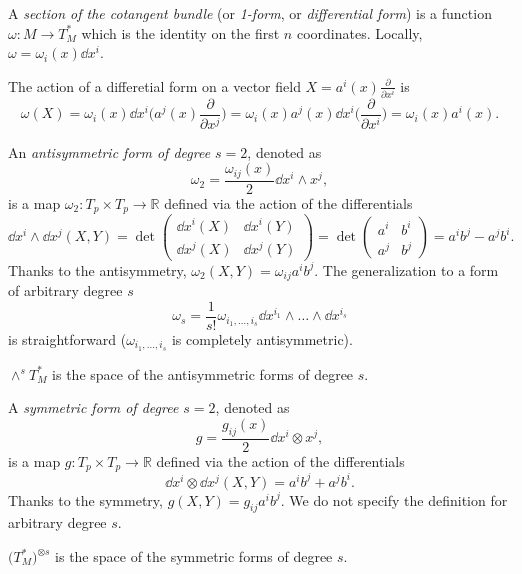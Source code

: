 \documentclass[a4paper,12pt]{book}
\begin{document}
\begin{definition}
A \emph{section of the cotangent bundle} (or \emph{1-form}, or \emph{differential form}) is a function $\omega\colon M\to T_M^*$ which is the identity on the first $n$ coordinates. Locally, $\omega=\omega_i(x)\dd x^i$.
\end{definition}

The action of a differetial form on a vector field $X=a^i(x)\frac{\partial}{\partial x^i}$ is
\[\omega(X)=\omega_i(x)\dd x^i\biggl(a^j(x)\frac{\partial}{\partial x^j}\biggr)=\omega_i(x)a^j(x)\dd x^i\biggl(\frac{\partial}{\partial x^i}\biggr)=\omega_i(x)a^i(x).\]

\begin{definition}
An \emph{antisymmetric form of degree $s=2$}, denoted as
\[\omega_2=\frac{\omega_{ij}(x)}{2}\dd x^i\wedge x^j,\] is a map $\omega_2\colon T_p\times T_p\to\mathbb R$ defined via the action of the differentials
\[\dd x^i\wedge \dd x^j(X,Y)=\det
\begin{pmatrix}
\dd x^i(X)& \dd x^i(Y)\\
\dd x^j(X)& \dd x^j(Y)
\end{pmatrix}=\det
\begin{pmatrix}
a^i& b^i\\
a^j& b^j
\end{pmatrix}=a^ib^j-a^jb^i.\]
Thanks to the antisymmetry, $\omega_2(X,Y)=\omega_{ij}a^ib^j$. The generalization to a form of arbitrary degree $s$
\[\omega_s=\frac{1}{s!}\omega_{i_1,\ldots,i_s}\dd x^{i_1}\wedge\ldots\wedge\dd x^{i_s}\]
is straightforward ($\omega_{i_1,\ldots,i_s}$ is completely antisymmetric).
\end{definition}

\begin{definition}
$\wedge^sT_M^*$ is the space of the antisymmetric forms of degree $s$.
\end{definition}

\begin{definition}
A \emph{symmetric form of degree $s=2$}, denoted as
\[g=\frac{g_{ij}(x)}{2}\dd x^i\otimes x^j,\] is a map $g\colon T_p\times T_p\to\mathbb R$ defined via the action of the differentials
\[\dd x^i\otimes \dd x^j(X,Y)=a^ib^j+a^jb^i.\]
Thanks to the symmetry, $g(X,Y)=g_{ij}a^ib^j$. We do not specify the definition for arbitrary degree $s$.
\end{definition}

\begin{definition}
$\bigl(T_M^*\bigr)^{\otimes s}$ is the space of the symmetric forms of degree $s$.
\end{definition}
\end{document}
